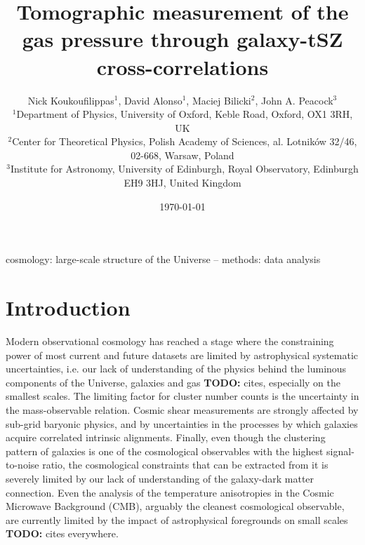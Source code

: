 \documentclass[useAMS,usenatbib]{mn2e}
\title[Tomographic measurement of the gas pressure through galaxy-tSZ cross-correlations]{Tomographic measurement of the gas pressure through galaxy-tSZ cross-correlations}
\author[David Alonso]{Nick Koukoufilippas$^1$, David Alonso$^1$, Maciej Bilicki$^2$, John A. Peacock$^3$\\
                      $^{1}$Department of Physics, University of Oxford, Keble Road, Oxford, OX1 3RH, UK\\
                      $^{2}$Center for Theoretical Physics, Polish Academy of Sciences, al. Lotnik\'ow 32/46, 02-668, Warsaw, Poland\\
                      $^{3}$Institute for Astronomy, University of Edinburgh, Royal Observatory, Edinburgh EH9 3HJ, United Kingdom
                      }
\newcommand{\TODO}[1]{{\bf TODO:} #1}
\begin{document}
  \date{\today}
   
  \maketitle

\begin{abstract}
  \lipsum[1]
\end{abstract}

\begin{keywords}
  cosmology: large-scale structure of the Universe -- methods: data analysis
\end{keywords}

\section{Introduction}\label{sec:intro}
  Modern observational cosmology has reached a stage where the constraining power of most current and future datasets are limited by astrophysical systematic uncertainties, i.e. our lack of understanding of the physics behind the luminous components of the Universe, galaxies and gas \TODO{cites}, especially on the smallest scales. The limiting factor for cluster number counts is the uncertainty in the mass-observable relation. Cosmic shear measurements are strongly affected by sub-grid baryonic physics, and by uncertainties in the processes by which galaxies acquire correlated intrinsic alignments. Finally, even though the clustering pattern of galaxies is one of the cosmological observables with the highest signal-to-noise ratio, the cosmological constraints that can be extracted from it is severely limited by our lack of understanding of the galaxy-dark matter connection. Even the analysis of the temperature anisotropies in the Cosmic Microwave Background (CMB), arguably the cleanest cosmological observable, are currently limited by the impact of astrophysical foregrounds on small scales \TODO{cites everywhere}.
  
\end{document}

